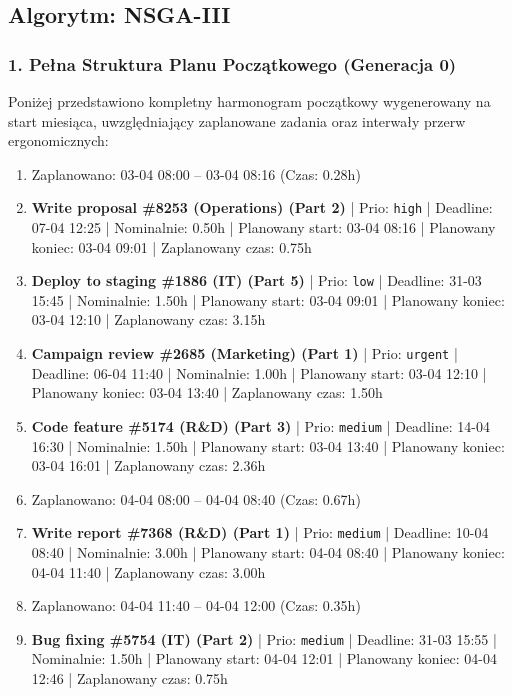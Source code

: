 \vspace{0.8cm}
\subsection{Algorytm: NSGA-III}

\subsubsection*{1. Pełna Struktura Planu Początkowego (Generacja 0)}
Poniżej przedstawiono kompletny harmonogram początkowy wygenerowany na start miesiąca, uwzględniający zaplanowane zadania oraz interwały przerw ergonomicznych:

{\footnotesize
\begin{enumerate}
  \item [\textbf{PRZERWA}] Zaplanowano: 03-04 08:00 -- 03-04 08:16 (Czas: 0.28h)
  \item [\textbf{14614}] \textbf{Write proposal \#8253 (Operations) (Part 2)} | Prio: \texttt{high} | Deadline: 07-04 12:25 | Nominalnie: 0.50h | Planowany start: 03-04 08:16 | Planowany koniec: 03-04 09:01 | Zaplanowany czas: 0.75h
  \item [\textbf{14697}] \textbf{Deploy to staging \#1886 (IT) (Part 5)} | Prio: \texttt{low} | Deadline: 31-03 15:45 | Nominalnie: 1.50h | Planowany start: 03-04 09:01 | Planowany koniec: 03-04 12:10 | Zaplanowany czas: 3.15h
  \item [\textbf{14607}] \textbf{Campaign review \#2685 (Marketing) (Part 1)} | Prio: \texttt{urgent} | Deadline: 06-04 11:40 | Nominalnie: 1.00h | Planowany start: 03-04 12:10 | Planowany koniec: 03-04 13:40 | Zaplanowany czas: 1.50h
  \item [\textbf{14646}] \textbf{Code feature \#5174 (R\&D) (Part 3)} | Prio: \texttt{medium} | Deadline: 14-04 16:30 | Nominalnie: 1.50h | Planowany start: 03-04 13:40 | Planowany koniec: 03-04 16:01 | Zaplanowany czas: 2.36h
  \item [\textbf{PRZERWA}] Zaplanowano: 04-04 08:00 -- 04-04 08:40 (Czas: 0.67h)
  \item [\textbf{14633}] \textbf{Write report \#7368 (R\&D) (Part 1)} | Prio: \texttt{medium} | Deadline: 10-04 08:40 | Nominalnie: 3.00h | Planowany start: 04-04 08:40 | Planowany koniec: 04-04 11:40 | Zaplanowany czas: 3.00h
  \item [\textbf{PRZERWA}] Zaplanowano: 04-04 11:40 -- 04-04 12:00 (Czas: 0.35h)
  \item [\textbf{14631}] \textbf{Bug fixing \#5754 (IT) (Part 2)} | Prio: \texttt{medium} | Deadline: 31-03 15:55 | Nominalnie: 1.50h | Planowany start: 04-04 12:01 | Planowany koniec: 04-04 12:46 | Zaplanowany czas: 0.75h

\end{enumerate}}

